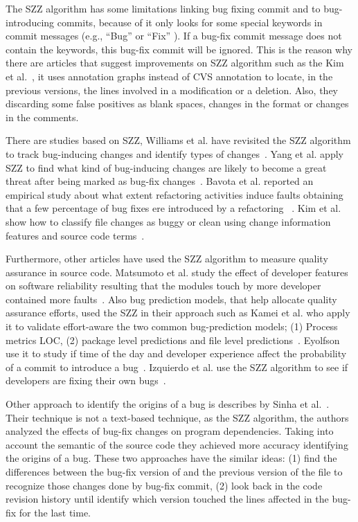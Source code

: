 \documentclass[ifip]{svmult}
\begin{document}
The SZZ algorithm has some limitations linking bug fixing commit and to bug-introducing commits, because of it only looks for some special keywords in commit messages (e.g., ``Bug'' or ``Fix'' \cite{kamei2007effects}). If a bug-fix commit message does not contain the keywords, this bug-fix commit will be ignored. This is the reason why there are articles that suggest improvements on SZZ algorithm such as the Kim et al.~\cite{kim2006automatic}, it uses annotation graphs instead of CVS annotation to locate, in the previous versions, the lines involved in a modification or a deletion. Also, they discarding some false positives as blank spaces, changes in the format or changes in the comments.

There are studies based on SZZ, Williams et al. have revisited the SZZ algorithm to track bug-inducing changes and identify types of changes~\cite{williams2008szz}. Yang et al. apply SZZ to find what kind of bug-inducing changes are likely to become a great threat after being marked as bug-fix changes~\cite{yangbug}. Bavota et al. reported an empirical study about what extent refactoring activities induce faults obtaining that a few percentage of bug fixes ere introduced by a refactoring ~\cite{bavota2012does}. Kim et al. show how to classify file changes as buggy or clean using change information features and source code terms~\cite{kim2008classifying}.

Furthermore, other articles have used the SZZ algorithm to measure quality assurance in source code. Matsumoto et al. study the effect of developer features on software reliability resulting that the modules touch by more developer contained more faults~\cite{matsumoto2010analysis}. Also bug prediction models, that help allocate quality assurance efforts, used the SZZ in their approach such as Kamei et al. who apply it to validate effort-aware the two common bug-prediction models; (1) Process metrics LOC, (2) package level predictions and file level predictions~\cite{kamei2010revisiting}. Eyolfson use it to study if time of the day and developer experience affect the probability of a commit to introduce a bug~\cite{eyolfson2011time}. Izquierdo et al. use the SZZ algorithm to see if developers are fixing their own bugs~\cite{izquierdo2011developers}.


Other approach to identify the origins of a bug is describes by Sinha et al.~\cite{sinha2010buginnings}. Their technique is not a text-based technique, as the SZZ algorithm, the authors analyzed the effects of bug-fix changes on program dependencies. Taking into account the semantic of the source code they achieved more accuracy identifying the origins of a bug. These two approaches have the similar ideas: (1) find the differences between the bug-fix version of and the previous version of the file to recognize those changes done by bug-fix commit, (2) look back in the code revision history until identify which version touched the lines affected in the bug-fix for the last time.
\end{document}
